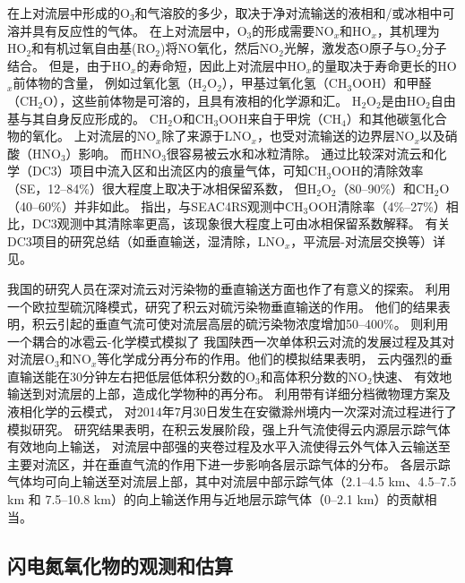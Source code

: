 在上对流层中形成的O$_3$和气溶胶的多少，取决于净对流输送的液相和/或冰相中可溶并具有反应性的气体。
在上对流层中，O$_3$的形成需要NO$_x$和HO$_x$，其机理为HO$_2$和有机过氧自由基(RO$_2$)将NO氧化，然后NO$_2$光解，激发态O原子与O$_2$分子结合。
但是，由于HO$_x$的寿命短，因此上对流层中HO$_x$的量取决于寿命更长的HO$_x$前体物的含量，
例如过氧化氢（H$_2$O$_2$），甲基过氧化氢（CH$_3$OOH）和甲醛（CH$_2$O）\citep{Chatfield.1984,Prather.1997}，这些前体物是可溶的，且具有液相的化学源和汇\citep{Barth.2007,Carlton.2007}。
H$_2$O$_2$是由HO$_2$自由基与其自身反应形成的。 CH$_2$O和CH$_3$OOH来自于甲烷（CH$_4$）和其他碳氢化合物的氧化。
上对流层的NO$_x$除了来源于LNO$_x$，也受对流输送的边界层NO$_x$以及硝酸（HNO$_3$）影响\citep{Grassian.2005}。
而HNO$_3$很容易被云水和冰粒清除\citep{Neu.2012}。
通过比较深对流云和化学（DC3）项目中流入区和出流区内的痕量气体，可知CH$_3$OOH的清除效率（SE，12--84\%）很大程度上取决于冰相保留系数，
但H$_2$O$_2$（80--90\%）和CH$_2$O（40--60\%）并非如此\citep{Barth.2016,Bela.2016,Fried.2016}。
\citet{Cuchiara.2020}指出，与SEAC4RS观测中CH$_3$OOH清除率（4\%--27\%）相比，DC3观测中其清除率更高，该现象很大程度上可由冰相保留系数解释。
有关DC3项目的研究总结（如垂直输送，湿清除，LNO$_x$，平流层-对流层交换等）详见\citet{Barth.2019}。

我国的研究人员在深对流云对污染物的垂直输送方面也作了有意义的探索。
\citet{GaoHuiWang.1998}利用一个欧拉型硫沉降模式，研究了积云对硫污染物垂直输送的作用。
他们的结果表明，积云引起的垂直气流可使对流层高层的硫污染物浓度增加50--400\%。
\cite{LiBing.1999,LiBing.2001}则利用一个耦合的冰雹云-化学模式模拟了
我国陕西一次单体积云对流的发展过程及其对对流层O$_3$和NO$_x$等化学成分再分布的作用。他们的模拟结果表明，
云内强烈的垂直输送能在30分钟左右把低层低体积分数的O$_3$和高体积分数的NO$_2$快速、
有效地输送到对流层的上部，造成化学物种的再分布。
\citet{HuJiaYing.2019}利用带有详细分档微物理方案及液相化学的云模式，
对2014年7月30日发生在安徽滁州境内一次深对流过程进行了模拟研究。
研究结果表明，在积云发展阶段，强上升气流使得云内源层示踪气体有效地向上输送，
对流层中部强的夹卷过程及水平入流使得云外气体入云输送至主要对流区，并在垂直气流的作用下进一步影响各层示踪气体的分布。
各层示踪气体均可向上输送至对流层上部，其中对流层中部示踪气体（2.1--4.5 km、4.5--7.5 km 和 7.5--10.8 km）的向上输送作用与近地层示踪气体（0--2.1 km）的贡献相当。


\subsection{闪电氮氧化物的观测和估算}


